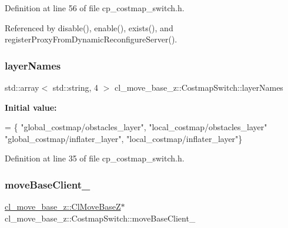Definition at line 56 of file cp\+\_\+costmap\+\_\+switch.\+h.



Referenced by disable(), enable(), exists(), and register\+Proxy\+From\+Dynamic\+Reconfigure\+Server().

\mbox{\label{classcl__move__base__z_1_1CostmapSwitch_aee0c75c8f4459cacaf583ef8c90ff329}} 
\subsubsection{\texorpdfstring{layer\+Names}{layerNames}}
{\footnotesize\ttfamily std\+::array$<$ std\+::string, 4 $>$ cl\+\_\+move\+\_\+base\+\_\+z\+::\+Costmap\+Switch\+::layer\+Names\hspace{0.3cm}{\ttfamily [static]}}

{\bfseries Initial value\+:}
\begin{DoxyCode}
=
        \{
            \textcolor{stringliteral}{"global\_costmap/obstacles\_layer"},
            \textcolor{stringliteral}{"local\_costmap/obstacles\_layer"}
            \textcolor{stringliteral}{"global\_costmap/inflater\_layer"},
            \textcolor{stringliteral}{"local\_costmap/inflater\_layer"}\}
\end{DoxyCode}


Definition at line 35 of file cp\+\_\+costmap\+\_\+switch.\+h.

\mbox{\label{classcl__move__base__z_1_1CostmapSwitch_acf03e8e1bb0ce2117b1a081ed0d073dd}} 
\subsubsection{\texorpdfstring{move\+Base\+Client\+\_\+}{moveBaseClient\_}}
{\footnotesize\ttfamily \hyperlink{classcl__move__base__z_1_1ClMoveBaseZ}{cl\+\_\+move\+\_\+base\+\_\+z\+::\+Cl\+Move\+BaseZ}$\ast$ cl\+\_\+move\+\_\+base\+\_\+z\+::\+Costmap\+Switch\+::move\+Base\+Client\+\_\+\hspace{0.3cm}{\ttfamily [private]}}




